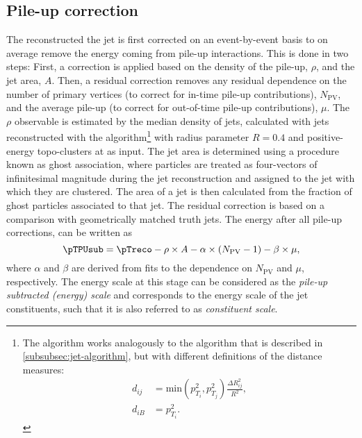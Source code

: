 \subsection{Pile-up correction}
\label{subsec:pile-up-correction}
The reconstructed the jet \pT is first corrected on an event-by-event basis to on average remove the energy coming from pile-up interactions. This is done in two steps: First, a correction is applied based on the \pT density of the pile-up, $\rho$, and the jet area, $A$. Then, a residual correction removes any residual \pT dependence on the number of primary vertices (to correct for in-time pile-up contributions), $N_\text{PV}$, and the average pile-up (to correct for out-of-time pile-up contributions), $\mu$.
The $\rho$ observable is estimated by the median \pT density of jets, calculated with jets reconstructed with the \kt algorithm\footnote{The \kt algorithm works analogously to the \antikt algorithm that is described in \cref{subsubsec:jet-algorithm}, but with different definitions of the distance measures:
    \begin{align*}
        d_{ij} & = \text{min}\left(p_{T_i}^2,p_{T_j}^2\right) \frac{\Delta R_{ij}^2}{R^2}, \\
        d_{iB} & = p_{T_i}^2.
        \label{eq:kt-distances}
    \end{align*}
}
with radius parameter $R = 0.4$ and positive-energy topo-clusters at  as input. The jet area is determined using a procedure known as ghost association, where particles are treated as four-vectors of infinitesimal magnitude during the jet reconstruction and assigned to the jet with which they are clustered. The area of a jet is then calculated from the fraction of ghost particles associated to that jet.
The residual correction is based on a comparison with geometrically matched truth jets. The energy after all pile-up corrections, can be written as
\begin{equation}
    \label{eq:pTpusub}
    \pTPUsub = \pTreco - \rho \times A - \alpha \times \left( N_{\text{PV}} - 1\right) - \beta \times \mu,
\end{equation}
where $\alpha$ and $\beta$ are derived from fits to the \pT dependence on $N_{\text{PV}}$ and $\mu$, respectively.
The energy scale at this stage can be considered as the \emph{pile-up subtracted (energy) scale} and corresponds to the energy scale of the jet constituents, such that it is also referred to as \emph{constituent scale}.

